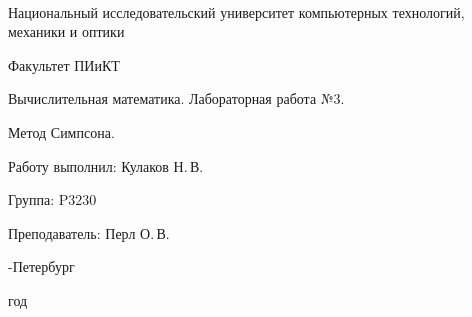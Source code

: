 \thispagestyle{empty}

\onecolumn
\begin{center}
	\
\vspace{1 cm}

\huge Национальный исследовательский университет компьютерных технологий, механики и оптики
\vspace{0.5cm}

\Huge Факультет ПИиКТ


\vspace{5cm}
\huge Вычислительная математика. Лабораторная работа №3.
\vspace{0.2cm}

\LARGE Метод Симпсона.
\end{center}
\vspace{5 cm}

\begin{flushright}
\Large

Работу выполнил: Кулаков Н.\,В.
\smallskip

Группа: P3230
\smallskip

Преподаватель: Перл О.\,В.
\smallskip

\vspace{4cm}
	
-Петербург

 год
\end{flushright}
